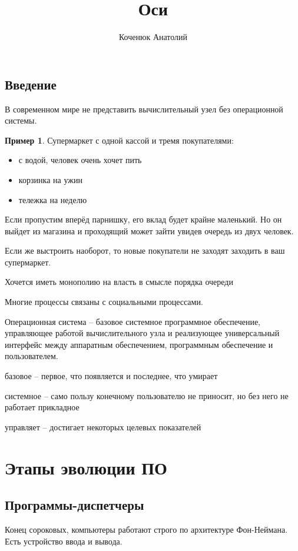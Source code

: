 \documentclass{book}
\author{Коченюк Анатолий}
\title{Оси}
\theoremstyle{definition}
\newtheorem*{example}{Пример}
\begin{document}
    \maketitle

    \section{Введение}

    В современном мире не представить вычислительный узел без операционной системы.

    \begin{example}
        Супермаркет с одной кассой и тремя покупателями:
        \begin{itemize}
            \item с водой, человек очень хочет пить
            \item корзинка на ужин
            \item тележка на неделю
        \end{itemize}

        Если пропустим вперёд парнишку, его вклад будет крайне маленький. Но он выйдет из магазина и проходящий может зайти увидев очередь из двух человек.

        Если же выстроить наоборот, то новые покупатели не заходят заходить в ваш супермаркет.

        Хочется иметь монополию на власть в смысле порядка очереди

        Многие процессы связаны с социальными процессами.
    \end{example}

    \begin{definition}
        Операционная система -- базовое системное программное обеспечение, управляющее работой вычислительного узла и реализующее универсальный интерфейс между аппаратным обеспечением, программным обеспечение и пользователем.

        базовое -- первое, что появляется и последнее, что умирает

        системное -- само пользу конечному пользователю не приносит, но без него не работает прикладное

        управляет -- достигает некоторых целевых показателей
    \end{definition}
    \chapter{Этапы эволюции ПО}
    \section{Программы-диспетчеры}
    Конец сороковых, компьютеры работают строго по архитектуре Фон-Неймана. Есть устройство ввода и вывода.
\end{document}
